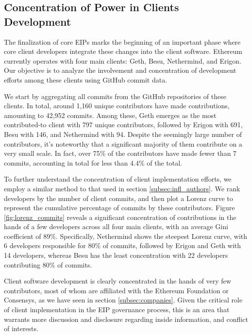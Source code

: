 \documentclass[No]{AEA}
\begin{document}
\subsection{Concentration of Power in Clients Development}

The finalization of core EIPs marks the beginning of an important phase where core client developers integrate these changes into the client software. Ethereum currently operates with four main clients: Geth, Besu, Nethermind, and Erigon. Our objective is to analyze the involvement and concentration of development efforts among these clients using GitHub commit data.

We start by aggregating all commits from the GitHub repositories of these clients. In total, around 1,160 unique contributors have made contributions, amounting to 42,952 commits. Among these, Geth emerges as the most contributed-to client with 797 unique contributors, followed by Erigon with 691, Besu with 146, and Nethermind with 94. Despite the seemingly large number of contributors, it's noteworthy that a significant majority of them contribute on a very small scale. In fact, over 75\% of the contributors have made fewer than 7 commits, accounting in total for less than 4.4\% of the total. 

To further understand the concentration of client implementation efforts, we employ a similar method to that used in section \ref{subsec:infl_authors}. We rank developers by the number of client commits, and then plot a Lorenz curve to represent the cumulative percentage of commits by these contributors. Figure \ref{fig:lorenz_commits} reveals a significant concentration of contributions in the hands of a few developers across all four main clients, with an average Gini coefficient of 89\%. Specifically, Nethermind shows the steepest Lorenz curve, with 6 developers responsible for 80\% of commits, followed by Erigon and Geth with 14 developers, whereas Besu has the least concentration with 22 developers contributing 80\% of commits. 

Client software development is clearly concentrated in the hands of very few contributors, most of whom are affiliated with the Ethereum Foundation or Consensys, as we have seen in section \ref{subsec:companies}. Given the critical role of client implementation in the EIP governance process, this is an area that warrants more discussion and disclosure regarding inside information, and conflict of interests. 
\end{document}
